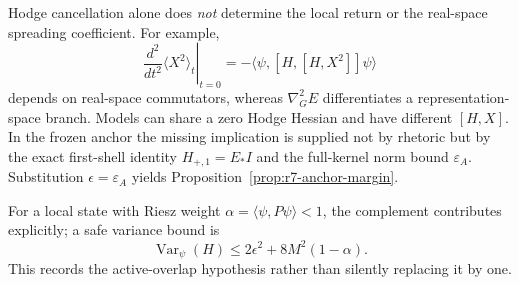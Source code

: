 Hodge cancellation alone does \emph{not} determine the local return or the
real-space spreading coefficient.  For example,
\begin{equation}
 \left.\frac{d^2}{dt^2}\langle X^2\rangle_t\right|_{t=0}
 =-\langle\psi,[H,[H,X^2]]\psi\rangle
\end{equation}
depends on real-space commutators, whereas $\nabla_G^2E$ differentiates a
representation-space branch.  Models can share a zero Hodge Hessian and have
different $[H,X]$.  In the frozen anchor the missing implication is supplied
not by rhetoric but by the exact first-shell identity $H_{+,1}=E_*I$ and the
full-kernel norm bound $\varepsilon_A$.  Substitution
$\epsilon=\varepsilon_A$ yields Proposition~\ref{prop:r7-anchor-margin}.

For a local state with Riesz weight
$\alpha=\langle\psi,P\psi\rangle<1$, the complement contributes explicitly;
a safe variance bound is
\begin{equation}
 \operatorname{Var}_\psi(H)
 \le 2\epsilon^2+8M^2(1-\alpha).
\end{equation}
This records the active-overlap hypothesis rather than silently replacing it
by one.
